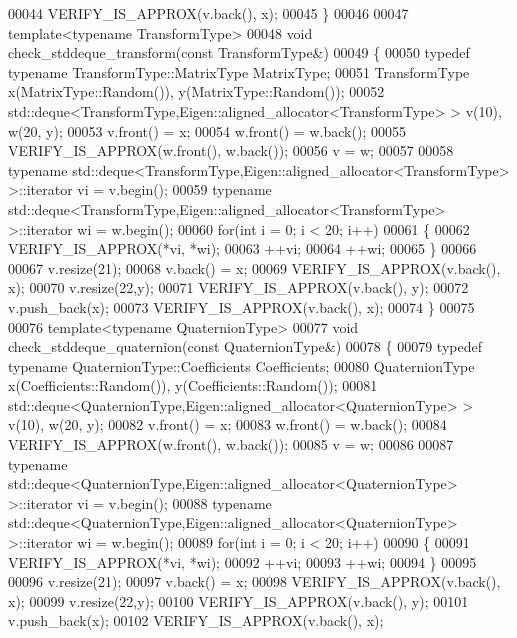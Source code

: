 \begin{DoxyCode}
00044   VERIFY\_IS\_APPROX(v.back(), x);
00045 \}
00046 
00047 \textcolor{keyword}{template}<\textcolor{keyword}{typename} TransformType>
00048 \textcolor{keywordtype}{void} check\_stddeque\_transform(\textcolor{keyword}{const} TransformType&)
00049 \{
00050   \textcolor{keyword}{typedef} \textcolor{keyword}{typename} TransformType::MatrixType MatrixType;
00051   TransformType x(MatrixType::Random()), y(MatrixType::Random());
00052   std::deque<TransformType,Eigen::aligned\_allocator<TransformType> > v(10), w(20, y);
00053   v.front() = x;
00054   w.front() = w.back();
00055   VERIFY\_IS\_APPROX(w.front(), w.back());
00056   v = w;
00057 
00058   \textcolor{keyword}{typename} std::deque<TransformType,Eigen::aligned\_allocator<TransformType> >::iterator vi = v.begin();
00059   \textcolor{keyword}{typename} std::deque<TransformType,Eigen::aligned\_allocator<TransformType> >::iterator wi = w.begin();
00060   \textcolor{keywordflow}{for}(\textcolor{keywordtype}{int} i = 0; i < 20; i++)
00061   \{
00062     VERIFY\_IS\_APPROX(*vi, *wi);
00063     ++vi;
00064     ++wi;
00065   \}
00066 
00067   v.resize(21);
00068   v.back() = x;
00069   VERIFY\_IS\_APPROX(v.back(), x);
00070   v.resize(22,y);
00071   VERIFY\_IS\_APPROX(v.back(), y);
00072   v.push\_back(x);
00073   VERIFY\_IS\_APPROX(v.back(), x);
00074 \}
00075 
00076 \textcolor{keyword}{template}<\textcolor{keyword}{typename} QuaternionType>
00077 \textcolor{keywordtype}{void} check\_stddeque\_quaternion(\textcolor{keyword}{const} QuaternionType&)
00078 \{
00079   \textcolor{keyword}{typedef} \textcolor{keyword}{typename} QuaternionType::Coefficients Coefficients;
00080   QuaternionType x(Coefficients::Random()), y(Coefficients::Random());
00081   std::deque<QuaternionType,Eigen::aligned\_allocator<QuaternionType> > v(10), w(20, y);
00082   v.front() = x;
00083   w.front() = w.back();
00084   VERIFY\_IS\_APPROX(w.front(), w.back());
00085   v = w;
00086 
00087   \textcolor{keyword}{typename} std::deque<QuaternionType,Eigen::aligned\_allocator<QuaternionType> >::iterator vi = v.begin();
00088   \textcolor{keyword}{typename} std::deque<QuaternionType,Eigen::aligned\_allocator<QuaternionType> >::iterator wi = w.begin();
00089   \textcolor{keywordflow}{for}(\textcolor{keywordtype}{int} i = 0; i < 20; i++)
00090   \{
00091     VERIFY\_IS\_APPROX(*vi, *wi);
00092     ++vi;
00093     ++wi;
00094   \}
00095 
00096   v.resize(21);
00097   v.back() = x;
00098   VERIFY\_IS\_APPROX(v.back(), x);
00099   v.resize(22,y);
00100   VERIFY\_IS\_APPROX(v.back(), y);
00101   v.push\_back(x);
00102   VERIFY\_IS\_APPROX(v.back(), x);

\end{DoxyCode}
